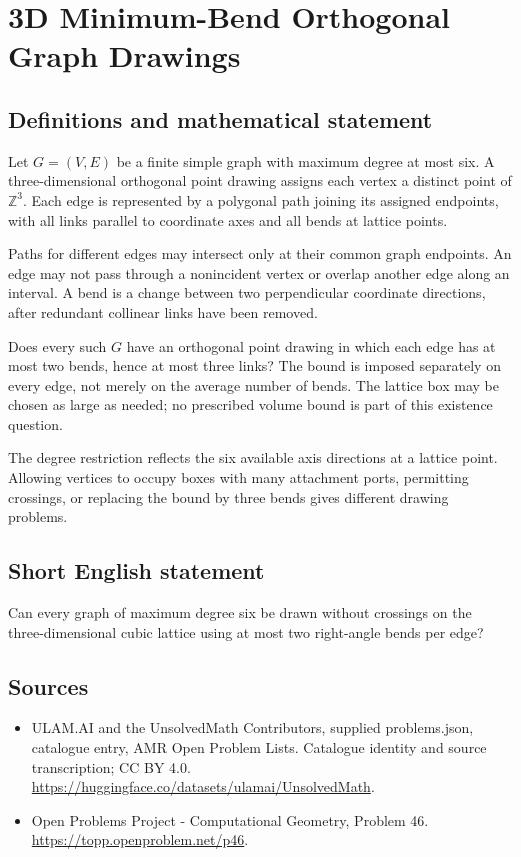 \documentclass[11pt,a4paper]{article}
\begin{document}
\section*{3D Minimum-Bend Orthogonal Graph Drawings}\label{statement}

\subsection{Definitions and mathematical statement}
Let $G=(V,E)$ be a finite simple graph with maximum degree at most
six. A three-dimensional orthogonal point drawing assigns each
vertex a distinct point of $\mathbb Z^3$. Each edge is represented
by a polygonal path joining its assigned endpoints, with all links
parallel to coordinate axes and all bends at lattice points.

Paths for different edges may intersect only at their common graph
endpoints. An edge may not pass through a nonincident vertex or
overlap another edge along an interval. A bend is a change between
two perpendicular coordinate directions, after redundant collinear
links have been removed.

Does every such $G$ have an orthogonal point drawing in which each
edge has at most two bends, hence at most three links? The bound
is imposed separately on every edge, not merely on the average
number of bends. The lattice box may be chosen as large as needed;
no prescribed volume bound is part of this existence question.

The degree restriction reflects the six available axis directions
at a lattice point. Allowing vertices to occupy boxes with many
attachment ports, permitting crossings, or replacing the bound by
three bends gives different drawing problems.
\subsection{Short English statement}
Can every graph of maximum degree six be drawn without crossings
on the three-dimensional cubic lattice using at most two right-angle
bends per edge?
\subsection{Sources}
\begin{itemize}
\item[S1] ULAM.AI and the UnsolvedMath Contributors, supplied problems.json, catalogue entry, AMR Open Problem Lists. Catalogue identity and source transcription; CC BY 4.0.
\url{https://huggingface.co/datasets/ulamai/UnsolvedMath}.
\item[S2] Open Problems Project - Computational Geometry, Problem 46. 
\url{https://topp.openproblem.net/p46}.
\end{itemize}
\end{document}

